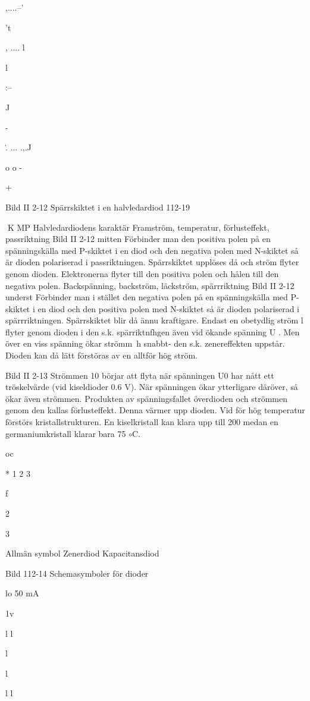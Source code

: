 \documentclass[a4paper,twoside,twocolumn,openright]{book}
\begin{document}
{{{,....--'

't

, .... l

l

:--

J

-~

\.. ... .,.J

o
o
-

+

Bild II 2-12 Spärrskiktet i en halvledardiod
112-19

K MP
Halvledardiodens karaktär
Framström, temperatur, förlusteffekt,
passriktning
Bild II 2-12 mitten
Förbinder man den positiva polen på en
spänningskälla med P-skiktet i en diod och
den negativa polen med N-skiktet så är
dioden polariserad i passriktningen. Spärrskiktet upplöses då och ström flyter genom
dioden. Elektronerna flyter till den positiva
polen och hålen till den negativa polen.
Backspänning, backström, läckström, spärrriktning
Bild II 2-12 underst
Förbinder man i stället den negativa polen
på en spänningskälla med P-skiktet i en diod
och den positiva polen med N-skiktet så är
dioden polariserad i spärrriktningen. Spärrskiktet blir då ännu kraftigare.
Endast en obetydlig ström l flyter genom dioden i den s.k. spärriktnfhgen även
vid ökande spänning U . Men över en viss
spänning ökar strömm~h snabbt- den s.k.
zenereffekten uppstår. Dioden kan då lätt
förstöras av en alltför hög ström.

Bild II 2-13
Strömmen 10 börjar att flyta när spänningen U0 har nått ett tröskelvärde (vid kiseldioder 0.6 V). När spänningen ökar ytterligare däröver, så ökar även strömmen.
Produkten av spänningsfallet överdioden
och strömmen genom den kallas förlusteffekt. Denna värmer upp dioden. Vid för hög
temperatur förstörs kristallstrukturen. En kiselkristall kan klara upp till 200
medan en
germaniumkristall klarar bara 75 $\circ$C.

oc

*
1
2
3

f

2

3

Allmän symbol
Zenerdiod
Kapacitansdiod

Bild 112-14 Schemasymboler för dioder

lo
50 mA

1v

l
l

l

l

l
l

}}}
\end{document}
